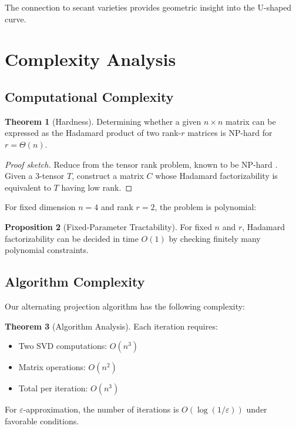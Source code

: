 \documentclass{article}
\theoremstyle{definition}
\newtheorem{theorem}{Theorem}
\newtheorem{proposition}[theorem]{Proposition}
\begin{document}
The connection to secant varieties \cite{landsberg2012tensors} provides geometric insight into the U-shaped curve.

\section{Complexity Analysis}

\subsection{Computational Complexity}

\begin{theorem}[Hardness]
Determining whether a given $n \times n$ matrix can be expressed as the Hadamard product of two rank-$r$ matrices is NP-hard for $r = \Theta(n)$.
\end{theorem}

\begin{proof}[Proof sketch]
Reduce from the tensor rank problem, known to be NP-hard \cite{hastad1990tensor}. Given a 3-tensor $T$, construct a matrix $C$ whose Hadamard factorizability is equivalent to $T$ having low rank.
\end{proof}

For fixed dimension $n = 4$ and rank $r = 2$, the problem is polynomial:

\begin{proposition}[Fixed-Parameter Tractability]
For fixed $n$ and $r$, Hadamard factorizability can be decided in time $O(1)$ by checking finitely many polynomial constraints.
\end{proposition}

\subsection{Algorithm Complexity}

Our alternating projection algorithm has the following complexity:

\begin{theorem}[Algorithm Analysis]
Each iteration requires:
\begin{itemize}
\item Two SVD computations: $O(n^3)$
\item Matrix operations: $O(n^2)$
\item Total per iteration: $O(n^3)$
\end{itemize}
For $\varepsilon$-approximation, the number of iterations is $O(\log(1/\varepsilon))$ under favorable conditions.
\end{theorem}
\end{document}
